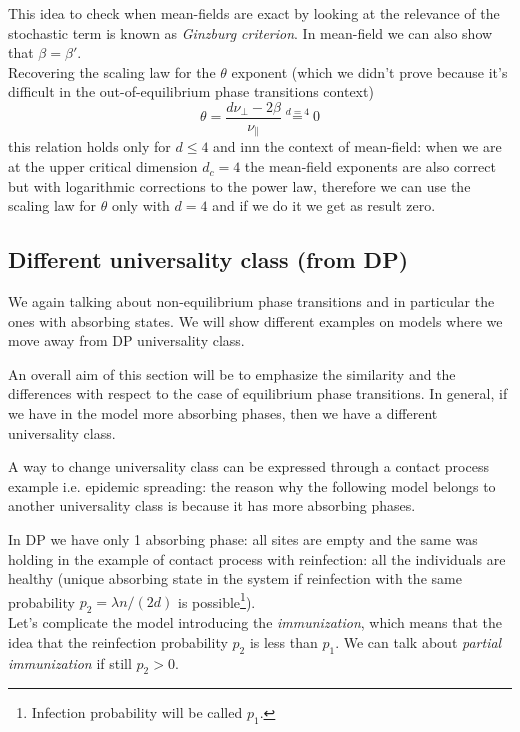 \documentclass[\main/main.tex]{subfiles}
\begin{document}
This idea to check when mean-fields are exact by looking at the relevance of the stochastic term is known as \textit{Ginzburg criterion}. In mean-field we can also show that $\beta=\beta'$. \\

Recovering the scaling law for the $\theta$ exponent (which we didn't prove because it's difficult in the out-of-equilibrium phase transitions context)
\begin{equation}
    \theta=\frac{d\nu_\perp-2\beta}{\nu_\|} \overset{d=4}{=} 0
\end{equation}
this relation holds only for $d\leq 4$ and inn the context of mean-field: when we are at the upper critical dimension $d_c=4$ the mean-field exponents are also correct but with logarithmic corrections to the power law, therefore we  can use the scaling law for $\theta$ only with $d=4$ and if we do it we get as result zero.

\subsection{Different universality class (from DP)}
We again talking about non-equilibrium phase transitions and in particular the ones with absorbing states. We will show different examples on models where we move away from DP universality class.

An overall aim of this section will be to emphasize the similarity and the differences with respect to the case of equilibrium phase transitions.
In general, if we have in the model more absorbing phases, then we have a different universality class.

A way to change universality class can be expressed through a contact process example i.e. epidemic spreading: the reason why the following model belongs to another universality class is because it has more absorbing phases.

In DP we have only 1 absorbing phase: all sites are empty and the same was holding in the example of contact process with reinfection: all the individuals are healthy (unique absorbing state in the system if reinfection with the same probability $p_2 = \lambda n /(2d)$ is possible\footnote{Infection probability will be called $p_1$.}). \\

Let's complicate the model introducing the \textit{immunization}, which means that the idea that the reinfection probability $p_2$ is less than $p_1$.
We can talk about \textit{partial immunization} if still $p_2>0$.
\end{document}
